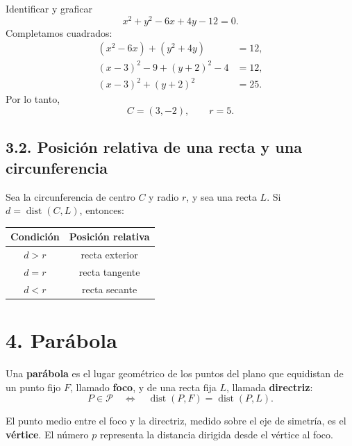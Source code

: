 \documentclass[11pt]{article}
\begin{document}
\begin{mdframed}[style=EjerSty,frametitle={Ejemplo resuelto}]
Identificar y graficar
\[
x^2+y^2-6x+4y-12=0.
\]
Completamos cuadrados:
\begin{align*}
(x^2-6x)+(y^2+4y)&=12,\\
(x-3)^2-9+(y+2)^2-4&=12,\\
(x-3)^2+(y+2)^2&=25.
\end{align*}
Por lo tanto,
\[
\boxed{C=(3,-2),\qquad r=5.}
\]
\end{mdframed}

\subsection*{3.2. Posición relativa de una recta y una circunferencia}

Sea la circunferencia de centro $C$ y radio $r$, y sea una recta $L$. Si $d=\operatorname{dist}(C,L)$, entonces:
\begin{center}
\begin{tabular}{c|c}
\toprule
Condición & Posición relativa \\
\midrule
$d>r$ & recta exterior \\
$d=r$ & recta tangente \\
$d<r$ & recta secante \\
\bottomrule
\end{tabular}
\end{center}

\section*{4. Parábola}

\begin{mdframed}[style=teoSty,frametitle={Definición de parábola}]
Una \textbf{parábola} es el lugar geométrico de los puntos del plano que equidistan de un punto fijo $F$, llamado \textbf{foco}, y de una recta fija $L$, llamada \textbf{directriz}:
\[
P\in\mathcal P
\quad\Longleftrightarrow\quad
\operatorname{dist}(P,F)=\operatorname{dist}(P,L).
\]
\end{mdframed}

El punto medio entre el foco y la directriz, medido sobre el eje de simetría, es el \textbf{vértice}. El número $p$ representa la distancia dirigida desde el vértice al foco.
\end{document}
